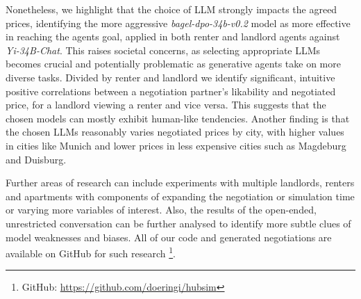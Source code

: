 \documentclass[runningheads]{llncs}
\begin{document}
Nonetheless, we highlight that the choice of LLM strongly impacts the agreed prices, identifying the more aggressive \textit{bagel-dpo-34b-v0.2} model as more effective in reaching the agents goal, applied in both renter and landlord agents against \textit{Yi-34B-Chat}. This raises societal concerns, as selecting appropriate LLMs becomes crucial and potentially problematic as generative agents take on more diverse tasks. Divided by renter and landlord we identify significant, intuitive positive correlations between a negotiation partner's likability and negotiated price, for a landlord viewing a renter and vice versa. This suggests that the chosen models can mostly exhibit human-like tendencies. Another finding is that the chosen LLMs reasonably varies negotiated prices by city, with higher values in cities like Munich and lower prices in less expensive cities such as Magdeburg and Duisburg. 

Further areas of research can include experiments with multiple landlords, renters and apartments with components of \cite{park_generative_2023} expanding the negotiation or simulation time or varying more variables of interest. Also, the results of the open-ended, unrestricted conversation can be further analysed to identify more subtle clues of model weaknesses and biases. All of our code and generated negotiations are available on GitHub for such research \footnote{GitHub: \url{https://github.com/doeringi/hubsim}}.

\end{document}
